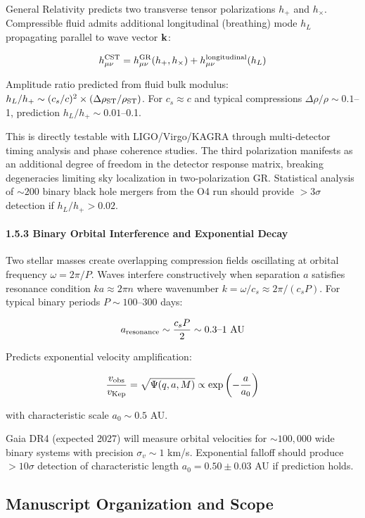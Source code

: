 \documentclass[10pt,a4paper]{article}
\begin{document}
General Relativity predicts two transverse tensor polarizations \(h_+\)
and \(h_\times\). Compressible fluid admits additional longitudinal
(breathing) mode \(h_L\) propagating parallel to wave vector
\({\bf k}\):

\[h_{\mu\nu}^{\rm CST} = h_{\mu\nu}^{\rm GR}(h_+, h_\times) + h_{\mu\nu}^{\rm longitudinal}(h_L)\]

Amplitude ratio predicted from fluid bulk modulus:
\(h_L/h_+ \sim (c_s/c)^2 \times (\Delta\rho_{\rm ST}/\rho_{\rm ST})\).
For \(c_s \approx c\) and typical compressions
\(\Delta\rho/\rho \sim 0.1\)--1, prediction \(h_L/h_+ \sim 0.01\)--0.1.

This is directly testable with LIGO/Virgo/KAGRA through multi-detector
timing analysis and phase coherence studies. The third polarization
manifests as an additional degree of freedom in the detector response
matrix, breaking degeneracies limiting sky localization in
two-polarization GR. Statistical analysis of \(\sim 200\) binary black
hole mergers from the O4 run should provide \(>3\sigma\) detection if
\(h_L/h_+ > 0.02\).

\paragraph{1.5.3 Binary Orbital Interference and Exponential
Decay}\label{binary-orbital-interference-and-exponential-decay}

Two stellar masses create overlapping compression fields oscillating at
orbital frequency \(\omega = 2\pi/P\). Waves interfere constructively
when separation \(a\) satisfies resonance condition
\(ka \approx 2\pi n\) where wavenumber
\(k = \omega/c_s \approx 2\pi/(c_s P)\). For typical binary periods
\(P \sim 100\)--300 days:

\[a_{\rm resonance} \sim \frac{c_s P}{2} \sim 0.3\text{--}1~{\rm AU}\]

Predicts exponential velocity amplification:

\[\frac{v_{\rm obs}}{v_{\rm Kep}} = \sqrt{\Psi(q,a,M)} \propto \exp\left(-\frac{a}{a_0}\right)\]

with characteristic scale \(a_0 \sim 0.5\) AU.

Gaia DR4 (expected 2027) will measure orbital velocities for
\(\sim 100,000\) wide binary systems with precision \(\sigma_v \sim 1\)
km/s. Exponential falloff should produce \(>10\sigma\) detection of
characteristic length \(a_0 = 0.50 \pm 0.03\) AU if prediction holds.

\subsection{Manuscript Organization and
Scope}\label{manuscript-organization-and-scope}
\end{document}

